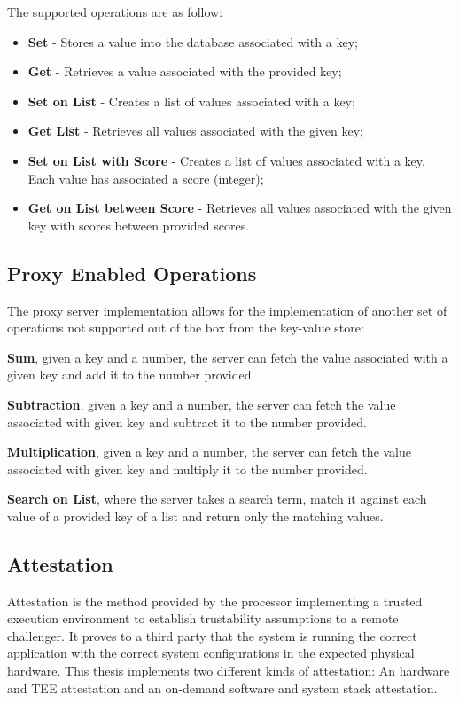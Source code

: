 The supported operations are as follow:

\begin{itemize}
  \item \textbf{Set} - Stores a value into the database associated with a key;
  \item \textbf{Get} - Retrieves a value associated with the provided key;
  \item \textbf{Set on List} - Creates a list of values associated with a key;
  \item \textbf{Get List} - Retrieves all values associated with the given key;
  \item \textbf{Set on List with Score} - Creates a list of values associated with a key. Each value has associated a score (integer);
  \item \textbf{Get on List between Score} - Retrieves all values associated with the given key with scores between provided scores.
\end{itemize}

\subsection{Proxy Enabled Operations}
\label{ssec:proxy_enabled_operations}

The proxy server implementation allows for the implementation of another set of operations not supported out of the box from the key-value store:

\textbf{Sum}, given a key and a number, the server can fetch the value associated with a given key and add it to the number provided.

\textbf{Subtraction}, given a key and a number, the server can fetch the value associated with given key and subtract it to the number provided.

\textbf{Multiplication}, given a key and a number, the server can fetch the value associated with given key and multiply it to the number provided.

\textbf{Search on List}, where the server takes a search term, match it against each value of a provided key of a list and return only the matching values.

\subsection{Attestation}
\label{ssec:attestation_system_model}

Attestation is the method provided by the processor implementing a trusted execution environment to establish trustability assumptions to a remote challenger. It proves to a third party that the system is running the correct application with the correct system configurations in the expected physical hardware. This thesis implements two different kinds of attestation: An hardware and \gls{TEE} attestation and an on-demand software and system stack attestation.

